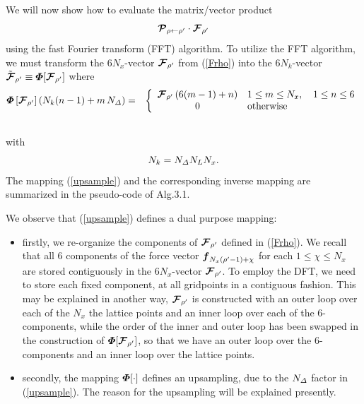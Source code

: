 We will now show how to evaluate the matrix/vector product 
\[
{\mbox{\boldmath$\cal P$\unboldmath}}_{ \rho \leftarrow {\rho }^{\prime}}\cdot{\mbox{\boldmath$\cal F$\unboldmath}}_{{\rho }^{\prime}}
\]
using the fast Fourier transform (FFT) algorithm. To utilize the FFT 
algorithm, we must  transform the $6 N_x$-vector
 ${\mbox{\boldmath$\cal F$\unboldmath}}_{{\rho }^{\prime}}$ from (\ref{Frho}) into
the $6 N_k$-vector $\tilde{\mbox{\boldmath$\cal F$\unboldmath}}_{{\rho }^{\prime}}\equiv 
{\mbox{\boldmath$\mit \Phi$\unboldmath}}[{\mbox{\boldmath$\cal F$\unboldmath}}_{{\rho }^{\prime}}]$ where
\begin{eqnarray} \label{upsample}
{\mbox{\boldmath$\mit \Phi$\unboldmath}}\left[{\mbox{\boldmath$\cal F$\unboldmath}}_{{\rho }^{\prime}}\right]\left({N_k (n-1)+m\,{N}_{\mit \Delta }}\right)
&=&\left\{
\begin{array}{cl}
 {\mbox{\boldmath$\cal F$\unboldmath}}_{{\rho }^{\prime}}\left({6(m-1)+n}\right)& 1 \le  m \le N_x, \quad 1 \le  n \le 6\\
 0& \mbox{otherwise}
 \end{array}\right.\nonumber\\
 &&
\end{eqnarray} 
with 
\begin{equation} \label{Nkdef}
N_k = {N}_{\mit \Delta } {N}_{L } N_x.
\end{equation}
The mapping (\ref{upsample}) and the corresponding inverse mapping are 
summarized in the pseudo-code of Alg.3.1.


We observe that (\ref{upsample}) defines a dual purpose mapping:
\begin{itemize}
\item firstly, we re-organize the components of ${\mbox{\boldmath$\cal F$\unboldmath}}_{{\rho 
}^{\prime}}$ defined in (\ref{Frho}). We recall that all $6$ components 
of the force vector ${\mbox{\boldmath$\mit f$\unboldmath}}_{{N}_{x}({\rho }^{\prime}-1)+\chi}$ for 
each  $ 1 \le 
\chi \le N_x$ are stored contiguously in the $6 N_x$-vector ${\mbox{\boldmath$\cal F$\unboldmath}}_{{\rho }^{\prime}}$. To employ the DFT, we need to store each fixed 
component, at all gridpoints in a contiguous fashion. This may be 
explained in another way,  ${\mbox{\boldmath$\cal F$\unboldmath}}_{{\rho 
}^{\prime}}$ is constructed with an outer loop over each of the $N_x$ the lattice points and 
an inner loop over each of the $6$-components, while the order of the 
inner and outer loop has been swapped in the construction of ${\mbox{\boldmath$\mit \Phi$\unboldmath}}[{\mbox{\boldmath$\cal F$\unboldmath}}_{{\rho 
}^{\prime}}]$, so that we have an outer loop over the $6$-components and 
an inner loop over the lattice points.
\item secondly, the mapping ${\mbox{\boldmath$\mit \Phi$\unboldmath}}[\cdot]$ defines an upsampling, 
due to the ${N}_{\mit \Delta }$ factor in (\ref{upsample}). The reason 
for the upsampling will be explained presently.
\end{itemize}

